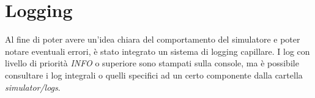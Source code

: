 \section{Logging}

Al fine di poter avere un'idea chiara del comportamento del simulatore e poter notare eventuali errori,
è stato integrato un sistema di logging capillare.
I log con livello di priorità \textit{INFO} o superiore sono stampati sulla console,
ma è possibile consultare i log integrali o quelli specifici ad un certo componente dalla cartella \textit{simulator/logs}.